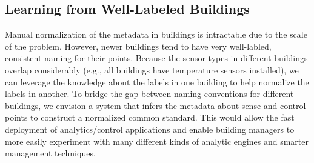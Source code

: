 \subsection{Learning from Well-Labeled Buildings}
Manual normalization of the metadata in buildings is intractable due to 
the scale of the problem. However, newer buildings tend to have very well-labled, consistent
naming for their points.
Because the sensor types in different buildings 
overlap considerably (e.g., all buildings have temperature sensors installed),
we can leverage the knowledge about the labels in one building to 
help normalize the labels in another.
To bridge the gap between naming conventions for different buildings, we envision 
a system that infers the metadata about sense and control points to construct a normalized 
common standard.
This would allow the fast deployment of analytics/control applications and enable
building managers to more easily experiment with many different kinds 
of analytic engines and smarter management techniques. 

